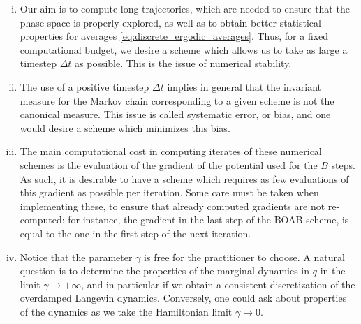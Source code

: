      \begin{enumerate}[(i)]
         \item Our aim is to compute long trajectories, which are needed to ensure that the phase space is properly explored, as well as to obtain better statistical properties for averages \eqref{eq:discrete_ergodic_averages}. Thus, for a fixed computational budget, we desire a scheme which allows us to take as large a timestep $\Delta t$ as possible. This is the issue of numerical stability.
         \item The use of a positive timestep $\Delta t$ implies in general that the invariant measure for the Markov chain corresponding to a given scheme is not the canonical measure. This issue is called systematic error, or bias, and one would desire a scheme which minimizes this bias.
         \item The main computational cost in computing iterates of these numerical schemes is the evaluation of the gradient of the potential used for the $B$ steps. As such, it is desirable to have a scheme which requires as few evaluations of this gradient as possible per iteration. Some care must be taken when implementing these, to ensure that already computed gradients are not re-computed: for instance, the gradient in the last step of the BOAB scheme, is equal to the one in the first step of the next iteration.
         \item Notice that the parameter $\gamma$ is free for the practitioner to choose. A natural question is to determine the properties of the marginal dynamics in $q$ in the limit $\gamma \to +\infty$, and in particular if we obtain a consistent discretization of the overdamped Langevin dynamics. Conversely, one could ask about properties of the dynamics as we take the Hamiltonian limit $\gamma\to 0$.
     \end{enumerate}

